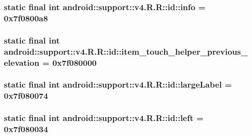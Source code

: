 \hypertarget{classandroid_1_1support_1_1v4_1_1_r_1_1id_8b931995ae0113032a59347dbab52a4e}{
\subsubsection[{info}]{\setlength{\rightskip}{0pt plus 5cm}static final int android::support::v4.R.R::id::info = 0x7f0800a8}}
\label{classandroid_1_1support_1_1v4_1_1_r_1_1id_8b931995ae0113032a59347dbab52a4e}


\hypertarget{classandroid_1_1support_1_1v4_1_1_r_1_1id_7c112d84703203b8c6b53e03eba9b291}{
\subsubsection[{item\_\-touch\_\-helper\_\-previous\_\-elevation}]{\setlength{\rightskip}{0pt plus 5cm}static final int android::support::v4.R.R::id::item\_\-touch\_\-helper\_\-previous\_\-elevation = 0x7f080000}}
\label{classandroid_1_1support_1_1v4_1_1_r_1_1id_7c112d84703203b8c6b53e03eba9b291}


\hypertarget{classandroid_1_1support_1_1v4_1_1_r_1_1id_5423fa18d4ed0e78623f4ed37b1b7598}{
\subsubsection[{largeLabel}]{\setlength{\rightskip}{0pt plus 5cm}static final int android::support::v4.R.R::id::largeLabel = 0x7f080074}}
\label{classandroid_1_1support_1_1v4_1_1_r_1_1id_5423fa18d4ed0e78623f4ed37b1b7598}


\hypertarget{classandroid_1_1support_1_1v4_1_1_r_1_1id_750384f18790153ca3b5e4a5b94b54a0}{
\subsubsection[{left}]{\setlength{\rightskip}{0pt plus 5cm}static final int android::support::v4.R.R::id::left = 0x7f080034}}
\label{classandroid_1_1support_1_1v4_1_1_r_1_1id_750384f18790153ca3b5e4a5b94b54a0}


